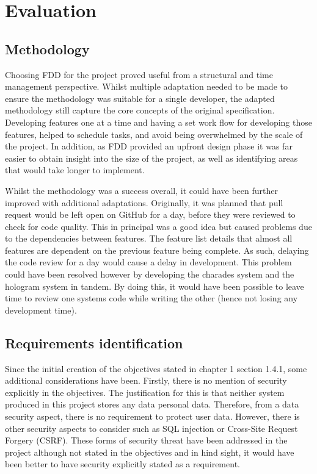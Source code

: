 \chapter{Evaluation}

\section{Methodology}
Choosing FDD for the project proved useful from a structural and time management perspective. Whilst multiple adaptation needed to be made to ensure the methodology was suitable for a single developer, the adapted methodology still capture the core concepts of the original specification. Developing features one at a time and having a set work flow for developing those features, helped to schedule tasks, and avoid being overwhelmed by the scale of the project. In addition, as FDD provided an upfront design phase it was far easier to obtain insight into the size of the project, as well as identifying areas that would take longer to implement.

Whilst the methodology was a success overall, it could have been further improved with additional adaptations. Originally, it was planned that pull request would be left open on GitHub for a day, before they were reviewed to check for code quality. This in principal was a good idea but caused problems due to the dependencies between features. The feature list details that almost all features are dependent on the previous feature being complete. As such, delaying the code review for a day would cause a delay in development. This problem could have been resolved however by developing the charades system and the hologram system in tandem. By doing this, it would have been possible to leave time to review one systems code while writing the other (hence not losing any development time).

\section{Requirements identification}

Since the initial creation of the objectives stated in chapter 1 section 1.4.1, some additional considerations have been. Firstly, there is no mention of security explicitly in the objectives. The justification for this is that neither system produced in this project stores any data personal data. Therefore, from a data security aspect, there is no requirement to protect user data. However, there is other security aspects to consider such as SQL injection or Cross-Site Request Forgery (CSRF). These forms of security threat have been addressed in the project although not stated in the objectives and in hind sight, it would have been better to have security explicitly stated as a requirement.

